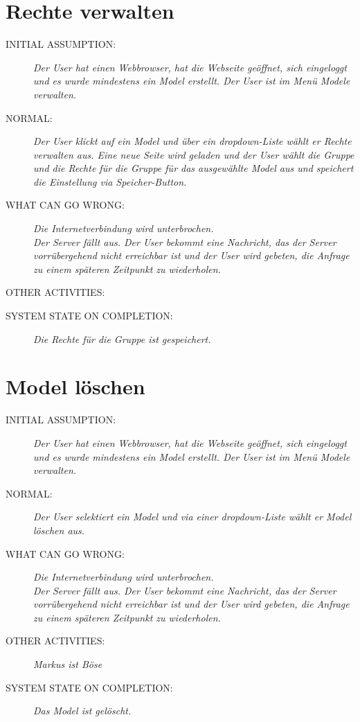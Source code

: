 {\section{Rechte verwalten}
\begin{description}
  \item [INITIAL ASSUMPTION:]
    \textit{Der \gls{User} hat einen Webbrowser, hat die Webseite geöffnet, sich eingeloggt und es wurde mindestens ein \gls{Model} erstellt. Der \gls{User} ist im Menü \gls{Model}e verwalten.}
  \item [NORMAL:]
    \textit{Der \gls{User} klickt auf ein \gls{Model} und über ein \gls{dropdown-Liste} wählt er Rechte verwalten aus.  Eine neue Seite wird geladen und der \gls{User} wählt die Gruppe und die Rechte für die Gruppe für das ausgewählte \gls{Model} aus und speichert die Einstellung via Speicher-Button.}
  \item [WHAT CAN GO WRONG:]
    \textit{Die Internetverbindung wird unterbrochen.\\
Der Server fällt aus. Der \gls{User} bekommt eine Nachricht, das der Server vorrübergehend nicht erreichbar ist und der \gls{User} wird gebeten, die Anfrage zu einem späteren Zeitpunkt zu wiederholen.\\
}
  \item [OTHER ACTIVITIES:]
    \textit{}
  \item [SYSTEM STATE ON COMPLETION:]
    \textit{Die Rechte für die Gruppe ist gespeichert.}
\end{description}

\section{\gls{Model} löschen}
\begin{description}
  \item [INITIAL ASSUMPTION:]
    \textit{Der \gls{User} hat einen Webbrowser, hat die Webseite geöffnet, sich eingeloggt und es wurde mindestens ein \gls{Model} erstellt. Der \gls{User} ist im Menü \gls{Model}e verwalten.}
  \item [NORMAL:]
    \textit{Der \gls{User} selektiert ein \gls{Model} und via einer \gls{dropdown-Liste} wählt er \gls{Model} löschen aus.}
  \item [WHAT CAN GO WRONG:]
    \textit{Die Internetverbindung wird unterbrochen.\\
Der Server fällt aus. Der \gls{User} bekommt eine Nachricht, das der Server vorrübergehend nicht erreichbar ist und der \gls{User} wird gebeten, die Anfrage zu einem späteren Zeitpunkt zu wiederholen.\\}
  \item [OTHER ACTIVITIES:]
    \textit{Markus ist Böse}
  \item [SYSTEM STATE ON COMPLETION:]
    \textit{Das \gls{Model} ist gelöscht.}
\end{description}

}
